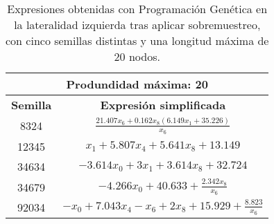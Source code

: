 \begin{table}[H]
\centering
\begin{tabular}{|c|c|}
\hline
\multicolumn{2}{|c|}{\textbf{Produndidad máxima: 20}}                                                                          \\ \hline
\textbf{Semilla} & \textbf{Expresión simplificada}                                                                             \\ \hline
8324             & $\frac{21.407 x_{6} + 0.162 x_{8} \left(6.149 x_{1} + 35.226\right)}{x_{6}}$ \\ \hline
12345            & $x_{1} + 5.807 x_{4} + 5.641 x_{8} + 13.149$                                                 \\ \hline
34634            & $- 3.614 x_{0} + 3 x_{1} + 3.614 x_{8} + 32.724$                                             \\ \hline
34679            & $- 4.266 x_{0} + 40.633 + \frac{2.342 x_{8}}{x_{6}}$                                   \\ \hline
92034            & $- x_{0} + 7.043 x_{4} - x_{6} + 2 x_{8} + 15.929 + \frac{8.823}{x_{6}}$                           \\ \hline
\end{tabular}%
\caption{Expresiones obtenidas con Programación Genética en la lateralidad izquierda tras aplicar sobremuestreo, con cinco semillas distintas y una longitud máxima de 20 nodos.}\label{table:exp_PG_over_l0_20}

\end{table}





